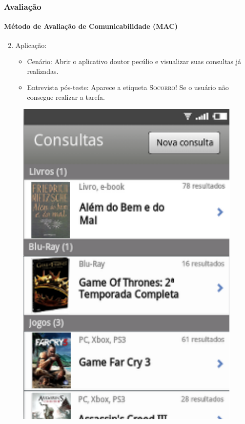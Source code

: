 \documentclass[14pt,beamer]{beamer}
\begin{document}
\begin{frame}
	\frametitle{Avaliação}
	\framesubtitle{Método de Avaliação de Comunicabilidade (MAC)}

	\begin{enumerate} \setcounter{enumi}{1}
        \item Aplicação:
            \begin{itemize}
                \item Cenário: Abrir o aplicativo doutor pecúlio e visualizar suas consultas já
                        realizadas.
                \item Entrevista pós-teste: Aparece a etiqueta \textsc{Socorro!} Se o usuário não consegue realizar a
                        tarefa.
            \end{itemize}
	\end{enumerate}
    
    \begin{figure}
        \centering
        \includegraphics[scale=.4]{tela/TelaHistorico}
    \end{figure}
\end{frame}
\end{document}
